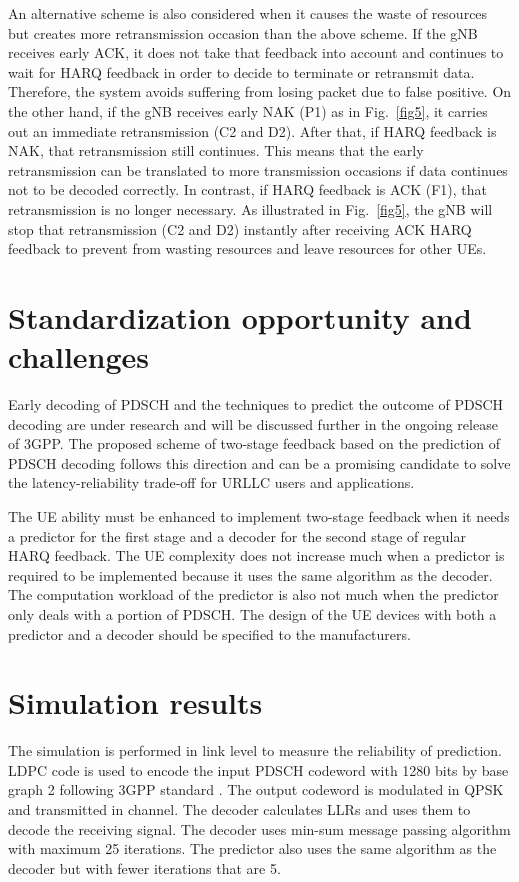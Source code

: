 \documentclass[conference]{IEEEtran}
\begin{document}
An alternative scheme is also considered when it causes the waste of resources but creates more retransmission occasion than the above scheme. If the gNB receives early ACK, it does not take that feedback into account and continues to wait for HARQ feedback in order to decide to terminate or retransmit data. Therefore, the system avoids suffering from losing packet due to false positive. On the other hand, if the gNB receives early NAK (P1) as in Fig.~\ref{fig5}, it carries out an immediate retransmission (C2 and D2). After that, if HARQ feedback is NAK, that retransmission still continues. This means that the early retransmission can be translated to more transmission occasions if data continues not to be decoded correctly. In contrast, if HARQ feedback is ACK (F1), that retransmission is no longer necessary. As illustrated in Fig.~\ref{fig5}, the gNB will stop that retransmission (C2 and D2) instantly after receiving ACK HARQ feedback to prevent from wasting resources and leave resources for other UEs. 

\section{Standardization opportunity and challenges}

Early decoding of PDSCH and the techniques to predict the outcome of PDSCH decoding are under research and will be discussed further in the ongoing release of 3GPP. The proposed scheme of two-stage feedback based on the prediction of PDSCH decoding follows this direction and can be a promising candidate to solve the latency-reliability trade-off for URLLC users and applications.

The UE ability must be enhanced to implement two-stage feedback when it needs a predictor for the first stage and a decoder for the second stage of regular HARQ feedback. The UE complexity does not increase much when a predictor is required to be implemented because it uses the same algorithm as the decoder. The computation workload of the predictor is also not much when the predictor only deals with a portion of PDSCH. The design of the UE devices with both a predictor and a decoder should be specified to the manufacturers.  

\section{Simulation results} \label{VV}
The simulation is performed in link level to measure the reliability of prediction. LDPC code is used to encode the input PDSCH codeword with 1280 bits by base graph 2 following 3GPP standard \cite{b8}. The output codeword is modulated in QPSK and transmitted in channel. The decoder calculates LLRs and uses them to decode the receiving signal. The decoder uses min-sum message passing algorithm with maximum 25 iterations. The predictor also uses the same algorithm as the decoder but with fewer iterations that are 5.
\end{document}
